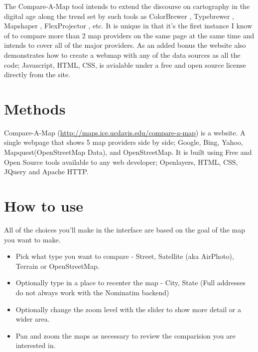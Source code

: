 \documentclass[12pt,letterpaper]{article}
\begin{document}
	  The Compare-A-Map tool intends to extend the discourse on cartography in the digital age along the trend set by such tools as ColorBrewer \parencite{Harrower2003}, Typebrewer \parencite{Sheesley2008}, Mapshaper \parencite{Bloch2006}, FlexProjector \parencite{Jenny2010} , etc. It is unique in that it's the first instance I know of to compare more than 2 map providers on the same page at the same time and intends to cover all of the major providers. As an added bonus the website also demonstrates how to create a webmap with any of the data sources as all the code; Javascript, HTML, CSS, is avialable under a free and open source license directly from the site.
	


\section{Methods}
Compare-A-Map (\url{http://maps.ice.ucdavis.edu/compare-a-map}) is a website. A single webpage that shows 5 map providers side by side; Google, Bing, Yahoo, Mapquest(OpenStreetMap Data), and OpenStreetMap. It is built using Free and Open Source tools available to any web developer; Openlayers, HTML, CSS, JQuery and Apache HTTP.


\section{How to use}
All of the choices you'll make in the interface are based on the goal of the map you want to make.

\begin{itemize}
\item Pick what type you want to compare - Street, Satellite (aka AirPhoto), Terrain or OpenStreetMap.
\item Optionally type in a place to recenter the map - City, State (Full addresses do not always work with the Nominatim backend)
\item Optionally change the zoom level with the slider to show more detail or a wider area.
\item Pan and zoom the maps as necessary to review the comparision you are interested in.
\end{itemize}
\end{document}
